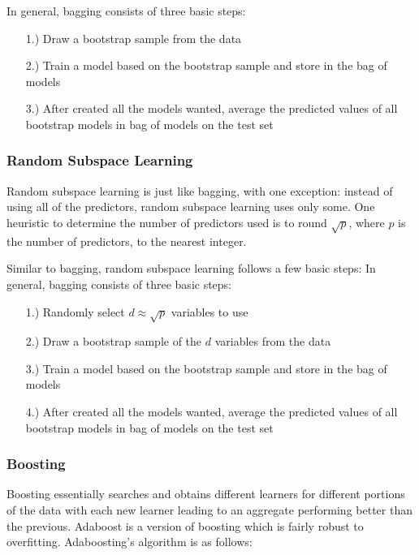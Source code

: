 \documentclass[a4paper]{article}
\begin{document}
    In general, bagging consists of three basic steps:
    \begin{enumerate}
    \item[1.)] Draw a bootstrap sample from the data  
    \item[2.)] Train a model based on the bootstrap sample and store in the bag of models
    \item[3.)] After created all the models wanted, average the predicted values of all bootstrap models in bag of models on the test set
    \end{enumerate}

    \subsubsection{Random Subspace Learning}
    Random subspace learning is just like bagging, with one exception: instead of using all of the predictors, random subspace learning uses only some. One heuristic to determine the number of predictors used is to round $\sqrt{p}$, where $p$ is the number of predictors, to the nearest integer.

    Similar to bagging, random subspace learning follows a few basic steps:
    In general, bagging consists of three basic steps:
    \begin{enumerate}
    \item[1.)] Randomly select $d\approx\sqrt{p}$ variables to use
    \item[2.)] Draw a bootstrap sample of the $d$ variables from the data  
    \item[3.)] Train a model based on the bootstrap sample and store in the bag of models
    \item[4.)] After created all the models wanted, average the predicted values of all bootstrap models in bag of models on the test set
    \end{enumerate}

  \subsubsection{Boosting}
    Boosting essentially searches and obtains different learners for different portions of the data with each new learner leading to an aggregate performing better than the previous. Adaboost is a version of boosting which is fairly robust to overfitting. Adaboosting's algorithm is as follows:
\end{document}
